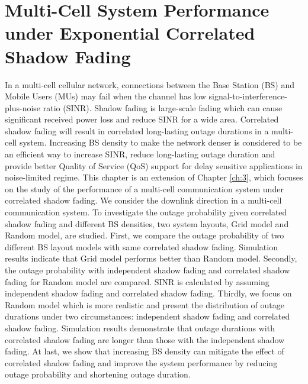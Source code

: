\chapter{Multi-Cell System Performance under Exponential Correlated Shadow Fading}\label{ch:4}
 \par In a multi-cell cellular network, connections between the Base Station (BS) and Mobile Users (MUs) may fail when the channel has low signal-to-interference-plus-noise ratio (SINR). Shadow fading is large-scale fading which can cause significant received power loss and reduce SINR for a wide area. Correlated shadow fading will result in correlated long-lasting outage durations in a multi-cell system. Increasing BS density to make the network denser is considered to be an efficient way to increase SINR, reduce long-lasting outage duration and provide better Quality of Service (QoS) support for delay sensitive applications in noise-limited regime. This chapter is an extension of Chapter \ref{ch:3}, which focuses on the study of the performance of a multi-cell communication system under correlated shadow fading. We consider the downlink direction in a multi-cell communication system. To investigate the outage probability given correlated shadow fading and different BS densities, two system layouts, Grid model and Random model, are studied. First, we compare the outage probability of two different BS layout models with same correlated shadow fading. Simulation results indicate that Grid model performs better than Random model. Secondly, the outage probability with independent shadow fading and correlated shadow fading for Random model are compared. SINR is calculated by assuming independent shadow fading and correlated shadow fading. Thirdly, we focus on Random model which is more realistic and present the distribution of outage durations under two circumstances: independent shadow fading and correlated shadow fading. Simulation results demonstrate that outage durations with correlated shadow fading are longer than those with the independent shadow fading. At last, we show that increasing BS density can mitigate the effect of correlated shadow fading and improve the system performance by reducing outage probability and shortening outage duration. 
